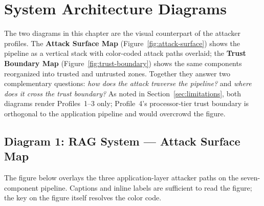 \documentclass[12pt, a4paper]{report}
\begin{document}
\chapter{System Architecture Diagrams}

The two diagrams in this chapter are the visual counterpart of the
attacker profiles. The \textbf{Attack Surface Map}
(Figure~\ref{fig:attack-surface}) shows the pipeline as a vertical stack
with color-coded attack paths overlaid; the \textbf{Trust Boundary Map}
(Figure~\ref{fig:trust-boundary}) shows the same components reorganized
into trusted and untrusted zones. Together they answer two complementary
questions: \emph{how does the attack traverse the pipeline?} and
\emph{where does it cross the trust boundary?} As noted in
Section~\ref{sec:limitations}, both diagrams render Profiles~1--3 only;
Profile~4's processor-tier trust boundary is orthogonal to the
application pipeline and would overcrowd the figure.

\section{Diagram 1: RAG System --- Attack Surface Map}

The figure below overlays the three application-layer attacker paths on
the seven-component pipeline. Captions and inline labels are sufficient
to read the figure; the key on the figure itself resolves the color code.
\end{document}
